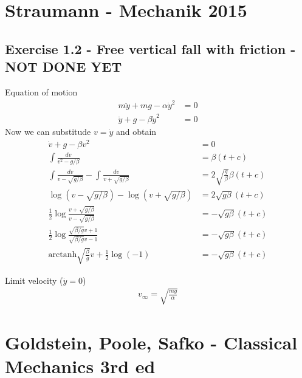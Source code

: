 \documentclass[../main.tex]{subfiles}
\begin{document}
\section{{\sc Straumann} -  Mechanik 2015}

\subsection{Exercise 1.2 - Free vertical fall with friction - NOT DONE YET}
Equation of motion
\begin{align}
m\ddot{y}+mg-\alpha\dot{y}^2&=0\\
\ddot{y}+g-\beta\dot{y}^2&=0
\end{align}
Now we can substitude $v=\dot{y}$ and obtain
\begin{align}
\dot{v}+g-\beta v^2&=0\\
\int\frac{dv}{v^2-g/\beta}&=\beta (t+c)\\
\int\frac{dv}{v-\sqrt{g/\beta}}-\int\frac{dv}{v+\sqrt{g/\beta}}&=2\sqrt{\frac{g}{\beta}}\beta (t+c)\\
\log\left(v-\sqrt{g/\beta}\right)-\log\left(v+\sqrt{g/\beta}\right)
&=2\sqrt{g\beta} (t+c)\\
\frac{1}{2}\log\frac{v+\sqrt{g/\beta}}{v-\sqrt{g/\beta}}&=-\sqrt{g\beta}(t+c)\\
\frac{1}{2}\log\frac{\sqrt{\beta/g} v+1}{\sqrt{\beta/g}v-1}&=-\sqrt{g\beta}(t+c)\\
\text{arctanh}\sqrt{\frac{\beta}{g}}v+\frac{1}{2}\log(-1)&=-\sqrt{g\beta}(t+c)
\end{align}

Limit velocity ($\ddot{y}=0$)
\begin{align}
v_\infty=\sqrt{\frac{mg}{\alpha}}
\end{align}

\section{{\sc Goldstein, Poole, Safko} - Classical Mechanics 3rd ed}
\end{document}
